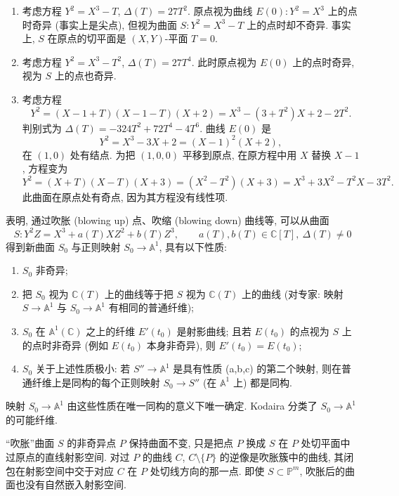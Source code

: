 \begin{example} \label{thm:2.7.1} 
\begin{enumerate}[label=\textup{(\alph*)}]
\item 考虑方程 $Y^2 = X^3 - T$, $\Delta(T) = 27T^2$. 原点视为曲线 $E(0)\colon Y^2 = X^3$ 上的点时奇异 (事实上是尖点), 但视为曲面 $S\colon Y^2 = X^3 - T$ 上的点时却不奇异. 事实上, $S$ 在原点的切平面是 $(X,Y)$-平面 $T = 0$.
\item 考虑方程 $Y^2 = X^3 - T^2$, $\Delta(T) = 27T^4$. 此时原点视为 $E(0)$ 上的点时奇异, 视为 $S$ 上的点也奇异.
\item 考虑方程
\[
Y^2 = (X - 1 + T)(X - 1 - T)(X + 2) = X^3 - (3 + T^2)X + 2 - 2T^2.
\]
判别式为 $\Delta(T) = -324T^2 + 72T^4 - 4T^6$. 曲线 $E(0)$ 是
\[
Y^2 = X^3 - 3X + 2 = (X-1)^2(X+2),
\]
在 $(1,0)$ 处有结点. 为把 $(1,0,0)$ 平移到原点, 在原方程中用 $X$ 替换 $X - 1$, 方程变为
\[
Y^2 = (X + T)(X - T)(X + 3) = (X^2 - T^2)(X + 3) = X^3 + 3X^2 - T^2X - 3T^2.
\]
此曲面在原点处有奇点, 因为其方程没有线性项.
\end{enumerate}
\end{example}

\cite{kodaira1960} 表明, 通过吹胀 (blowing up) 点、吹缩 (blowing down) 曲线等, 可以从曲面
\[
S\colon Y^2Z = X^3 + a(T)XZ^2 + b(T)Z^3, \qquad a(T), b(T)\in\mathbb{C}[T], \ \Delta(T)\neq 0
\]
得到新曲面 $S_0$ 与正则映射 $S_0\to\mathbb{A}^1$, 具有以下性质:
\begin{enumerate}[label=\textup{(\alph*)}]
\item $S_0$ 非奇异;
\item 把 $S_0$ 视为 $\mathbb{C}(T)$ 上的曲线等于把 $S$ 视为 $\mathbb{C}(T)$ 上的曲线 (对专家: 映射 $S\to\mathbb{A}^1$ 与 $S_0\to\mathbb{A}^1$ 有相同的普通纤维);
\item $S_0$ 在 $\mathbb{A}^1(\mathbb{C})$ 之上的纤维 $E'(t_0)$ 是射影曲线; 且若 $E(t_0)$ 的点视为 $S$ 上的点时非奇异 (例如 $E(t_0)$ 本身非奇异), 则 $E'(t_0) = E(t_0)$;
\item $S_0$ 关于上述性质极小: 若 $S''\to\mathbb{A}^1$ 是具有性质 (a,b,c) 的第二个映射, 则在普通纤维上是同构的每个正则映射 $S_0\to S''$ (在 $\mathbb{A}^1$ 上) 都是同构.
\end{enumerate}
映射 $S_0\to\mathbb{A}^1$ 由这些性质在唯一同构的意义下唯一确定. Kodaira 分类了 $S_0\to\mathbb{A}^1$ 的可能纤维.

``吹胀''曲面 $S$ 的非奇异点 $P$ 保持曲面不变, 只是把点 $P$ 换成 $S$ 在 $P$ 处切平面中过原点的直线射影空间. 对过 $P$ 的曲线 $C$, $C\setminus\{P\}$ 的逆像是吹胀簇中的曲线, 其闭包在射影空间中交于对应 $C$ 在 $P$ 处切线方向的那一点. 即使 $S\subset\mathbb{P}^m$, 吹胀后的曲面也没有自然嵌入射影空间.


